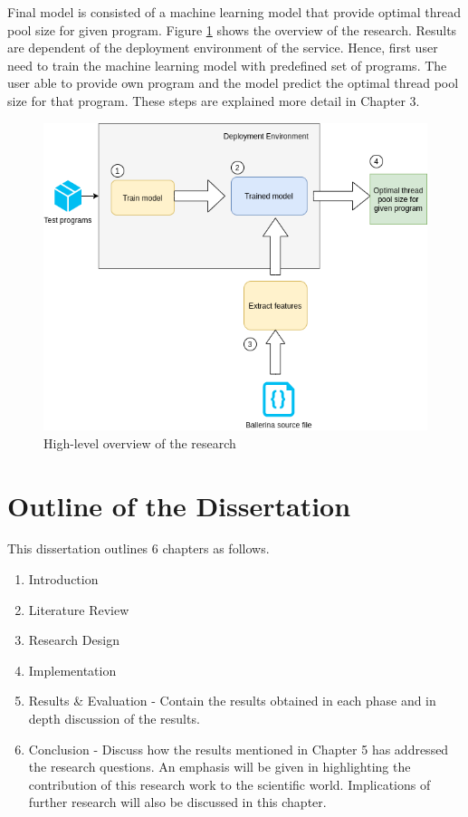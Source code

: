 	Final model is consisted of a machine learning model that provide optimal thread pool size for given program. Figure  \ref{hl_architecture} shows the overview of the research. Results are dependent of the deployment environment of the service. Hence, first user need to train the machine learning model with predefined set of programs. The user able to provide own program and the model predict the optimal thread pool size for that program. These steps are explained more detail in Chapter 3.   
	
	\begin{figure}[htbp]
		\begin{center}
			\includegraphics[scale=0.5]{figures/hl_architecture.png}
		\end{center}
		\caption{High-level overview of the research}
		\label{hl_architecture}
	\end{figure}
	

\section{Outline of the Dissertation}

This dissertation outlines 6 chapters as follows.

\begin{enumerate}
	\item Introduction
	\item Literature Review 
	\item Research Design
	\item Implementation
	\item Results \& Evaluation - Contain the results obtained in each phase and in depth discussion of the results.
	\item Conclusion - Discuss how the results mentioned in Chapter 5 has addressed the research questions. An emphasis will be given in highlighting the contribution of this research work to the scientific world. Implications of further research will also be discussed in this chapter.
\end{enumerate}

